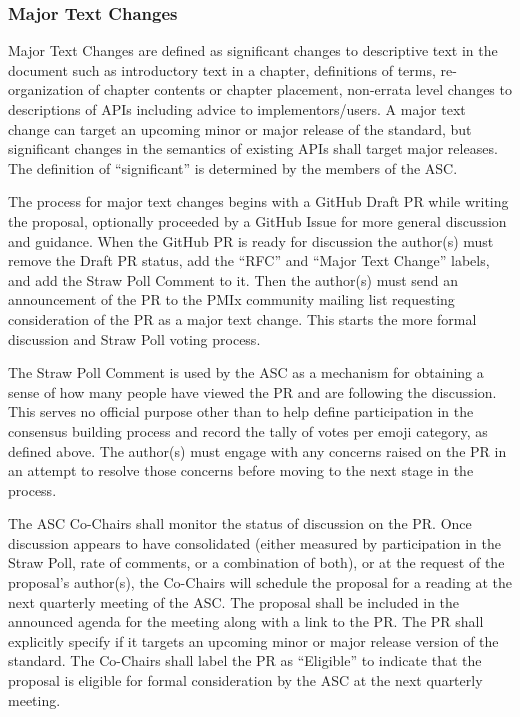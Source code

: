 \documentclass{article}
\begin{document}
\hypertarget{major-text-changes}{%
\subsubsection{Major Text Changes}%
\label{major-text-changes}}

Major Text Changes are defined as significant changes to descriptive text in
the document such as introductory text in a chapter, definitions of terms,
re-organization of chapter contents or chapter placement, non-errata level
changes to descriptions of APIs including advice to implementors/users.
A major text change can target an upcoming minor or major release of the
standard, but significant changes in the semantics of existing
APIs shall target major releases. The definition of ``significant''
is determined by the members of the ASC.

The process for major text changes begins with a GitHub Draft PR while writing the proposal, optionally proceeded by a GitHub Issue for more general discussion and guidance.
When the GitHub PR is ready for discussion the author(s) must remove the Draft PR status, add the ``RFC'' and ``Major Text Change'' labels, and add the Straw Poll Comment to it.
Then the author(s) must send an announcement of the PR to the PMIx community mailing list requesting consideration of the PR as a major text change.
This starts the more formal discussion and Straw Poll voting process.

The Straw Poll Comment is used by the ASC as a mechanism for
obtaining a sense of how many people have viewed the PR and are
following the discussion. This serves no official purpose other than to
help define participation in the consensus building process and record
the tally of votes per emoji category, as defined above.
The author(s) must engage with any concerns raised on the PR in an attempt to
resolve those concerns before moving to the next stage in the process.

The ASC Co-Chairs shall monitor the status of discussion on the PR. Once
discussion appears to have consolidated (either measured by
participation in the Straw Poll, rate of comments, or a combination of
both), or at the request of the proposal's author(s), the Co-Chairs will
schedule the proposal for a reading at the next quarterly meeting of the
ASC. The proposal shall be included in the announced agenda for the
meeting along with a link to the PR. The PR shall explicitly specify if
it targets an upcoming minor or major release version of the standard.
The Co-Chairs shall label the PR as ``Eligible'' to indicate that the proposal is
eligible for formal consideration by the ASC at the next quarterly meeting.
\end{document}
